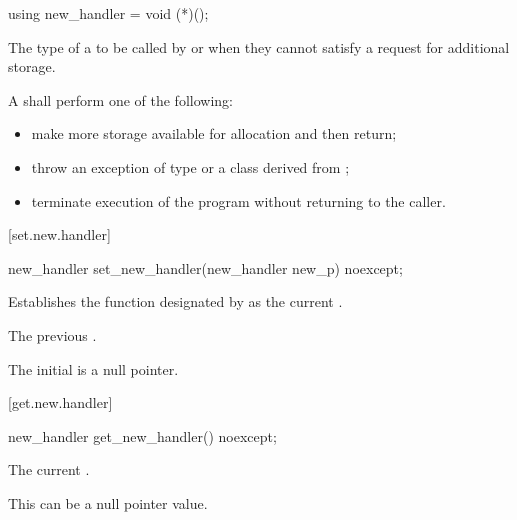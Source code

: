 %
\begin{itemdecl}
using new_handler = void (*)();
\end{itemdecl}

\begin{itemdescr}
\pnum
The type of a
to be called by
or
 when they cannot satisfy a request for additional storage.

\pnum
\required
A  shall perform one of the following:
\begin{itemize}
\item
make more storage available for allocation and then return;
\item
throw an exception of type
or a class derived from
%
;
\item
terminate execution of the program without returning to the caller.
%
%
\end{itemize}
\end{itemdescr}

[set.new.handler]{}

%
\begin{itemdecl}
new_handler set_new_handler(new_handler new_p) noexcept;
\end{itemdecl}

\begin{itemdescr}
\pnum
\effects
Establishes the function designated by  as the current
.

\pnum
\returns
The previous .

\pnum
\remarks
The initial  is a null pointer.
\end{itemdescr}

[get.new.handler]{}

%
\begin{itemdecl}
new_handler get_new_handler() noexcept;
\end{itemdecl}

\begin{itemdescr}
\pnum
\returns
The current .
\begin{note}
This can be a null pointer value.
\end{note}
\end{itemdescr}

